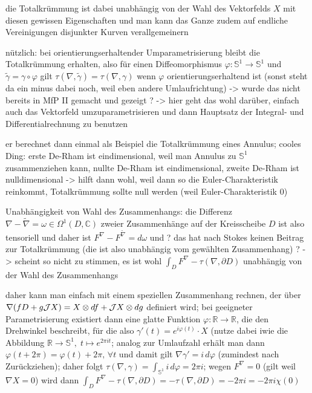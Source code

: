 \documentclass[../H_Analysis_main.tex]{subfiles}
\begin{document}
die Totalkrümmung ist dabei unabhängig von der Wahl des Vektorfelds $X$ mit diesen gewissen Eigenschaften und man kann das Ganze zudem auf endliche Vereinigungen disjunkter Kurven verallgemeinern

nützlich: bei orientierungserhaltender Umparametrisierung bleibt die Totalkrümmung erhalten, also für einen Diffeomorphismus $\varphi: \mathbb{S}^1 \rightarrow \mathbb{S}^1$ und $\tilde{\gamma} = \gamma \circ \varphi$ gilt $\tau(\nabla, \tilde{\gamma}) = \tau(\nabla, \gamma)$ wenn $\varphi$ orientierungserhaltend ist (sonst steht da ein minus dabei noch, weil eben andere Umlaufrichtung) -> wurde das nicht bereits in MfP II gemacht und gezeigt ? -> hier geht das wohl darüber, einfach auch das Vektorfeld umzuparametrisieren und dann Hauptsatz der Integral- und Differentialrechnung zu benutzen


er berechnet dann einmal als Beispiel die Totalkrümmung eines Annulus; cooles Ding: erste De-Rham ist eindimensional, weil man Annulus zu $\mathbb{S}^1$ zusammenziehen kann, nullte De-Rham ist eindimensional, zweite De-Rham ist nulldimensional -> hilft dann wohl, weil dann so die Euler-Charakteristik reinkommt, Totalkrümmung sollte null werden (weil Euler-Charakteristik 0)

Unabhängigkeit von Wahl des Zusammenhangs: die Differenz $\nabla - \tilde{\nabla} = \omega \in \Omega^1(D, \mathbb{C})$ zweier Zusammenhänge auf der Kreisscheibe $D$ ist also tensoriell und daher ist $F^\nabla - F^{\tilde{\nabla}} = d\omega$ und ? das hat nach Stokes keinen Beitrag zur Totalkrümmung (die ist also unabhängig vom gewählten Zusammenhang) ? -> scheint so nicht zu stimmen, es ist wohl $\int_D F^\nabla - \tau(\nabla, \partial D)$ unabhängig von der Wahl des Zusammenhangs

daher kann man einfach mit einem speziellen Zusammenhang rechnen, der über $\nabla\qty(f D + g \mathcal{J} X) = X \otimes df + \mathcal{J}X \otimes dg$ definiert wird; bei geeigneter Parametrisierung existiert dann eine glatte Funktion $\varphi: \mathbb{R} \rightarrow \mathbb{R}$, die den Drehwinkel beschreibt, für die also $\gamma'(t) = e^{i \varphi(t)} \cdot X$ (nutze dabei iwie die Abbildung $\mathbb{R} \rightarrow \mathbb{S}^1, \; t \mapsto e^{2 \pi i t}$; analog zur Umlaufzahl erhält man dann $\varphi(t + 2\pi) = \varphi(t) + 2\pi, \, \forall t$ und damit gilt $\nabla \gamma' = i \, d\varphi$ (zumindest nach Zurückziehen); daher folgt $\tau(\nabla, \gamma) = \int_{\mathbb{S}^1} i \, d\varphi = 2\pi i$; wegen $F^\nabla = 0$ (gilt weil $\nabla X = 0$) wird dann $\int_D F^\nabla - \tau(\nabla, \partial D) = - \tau(\nabla, \partial D) = -2\pi i = -2\pi i \chi(0)$
\end{document}
